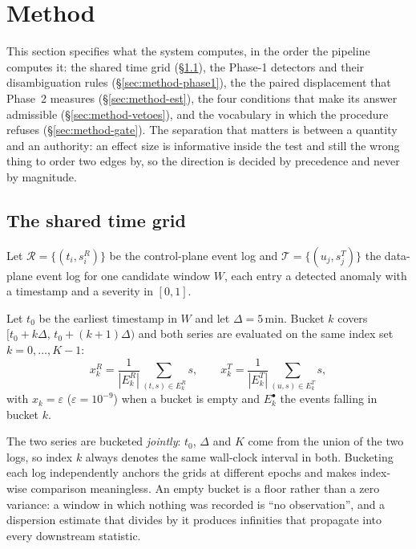 \section{Method}
\label{sec:method}

This section specifies what the system computes, in the order the pipeline
computes it: the shared time grid (\S\ref{sec:method-grid}), the Phase-1
detectors and their disambiguation rules (\S\ref{sec:method-phase1}), the
the paired displacement that Phase~2 measures (\S\ref{sec:method-est}), the
four conditions that make its answer admissible (\S\ref{sec:method-vetoes}),
and the vocabulary in which the procedure refuses
(\S\ref{sec:method-gate}). The separation that matters is between a
quantity and an authority: an effect size is informative inside the test
and still the wrong thing to order two edges by, so the direction is
decided by precedence and never by magnitude.

\subsection{The shared time grid}
\label{sec:method-grid}

Let $\mathcal{R}=\{(t_i,s_i^R)\}$ be the control-plane event log and
$\mathcal{T}=\{(u_j,s_j^T)\}$ the data-plane event log for one candidate
window $W$, each entry a detected anomaly with a timestamp and a severity
in $[0,1]$.

\begin{definition}
\label{def:grid}
Let $t_0$ be the earliest timestamp in $W$ and let $\Delta=5$\,min.
Bucket $k$ covers $[t_0+k\Delta,\,t_0+(k+1)\Delta)$ and both series
are evaluated on the same index set $k=0,\dots,K-1$:
\[
x^R_k=\frac{1}{|E^R_k|}\sum_{(t,s)\in E^R_k} s,\qquad
x^T_k=\frac{1}{|E^T_k|}\sum_{(u,s)\in E^T_k} s,
\]
with $x_k=\varepsilon$ ($\varepsilon=10^{-9}$) when a bucket is empty
and $E^\bullet_k$ the events falling in bucket $k$.
\end{definition}

The two series are bucketed \emph{jointly}: $t_0$, $\Delta$ and $K$ come
from the union of the two logs, so index $k$ always denotes the same
wall-clock interval in both. Bucketing each log independently anchors the
grids at different epochs and makes index-wise comparison meaningless. An
empty bucket is a floor rather than a zero variance: a window in which
nothing was recorded is ``no observation'', and a dispersion estimate that
divides by it produces infinities that propagate into every downstream
statistic.

